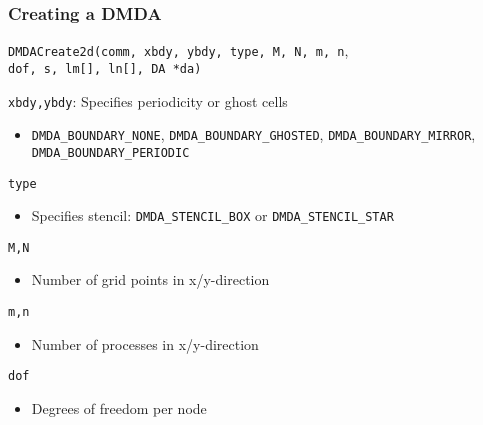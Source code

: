 \begin{frame}[fragile]
\frametitle{Creating a DMDA}

{\small \lstinline|DMDACreate2d(comm, xbdy, ybdy, type, M, N, m, n|, \\
\qquad\qquad\qquad \qquad  \lstinline|dof, s, lm[], ln[], DA *da)|}

\begin{block}{\lstinline|xbdy,ybdy|: Specifies periodicity or ghost cells}
  \vspace*{-0.2cm}
  \begin{itemize}
    \item \lstinline|DMDA_BOUNDARY_NONE|, \lstinline|DMDA_BOUNDARY_GHOSTED|, \lstinline|DMDA_BOUNDARY_MIRROR|, \lstinline|DMDA_BOUNDARY_PERIODIC|
  \end{itemize}
\end{block}

\vspace*{-0.3cm}
\begin{block}{\lstinline|type|}
  \vspace*{-0.2cm}
  \begin{itemize}
    \item Specifies stencil: \lstinline|DMDA_STENCIL_BOX| or \lstinline|DMDA_STENCIL_STAR|
  \end{itemize}
\end{block}

\vspace*{-0.3cm}
\begin{block}{\lstinline|M,N|}
  \vspace*{-0.2cm}
  \begin{itemize}
    \item Number of grid points in x/y-direction
  \end{itemize}
\end{block}

\vspace*{-0.3cm}
\begin{block}{\lstinline|m,n|}
  \vspace*{-0.2cm}
  \begin{itemize}
    \item Number of processes in x/y-direction
  \end{itemize}
\end{block}

\vspace*{-0.3cm}
\begin{block}{\lstinline|dof|}
  \vspace*{-0.2cm}
  \begin{itemize}
    \item Degrees of freedom per node
  \end{itemize}
\end{block}


\end{frame}
